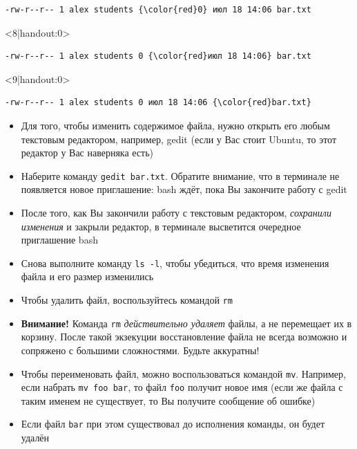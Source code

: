 \documentclass{beamer}
\begin{document}
\begin{frame}[fragile]
\begin{onlyenv}
\begin{Verbatim}[commandchars=\\\{\},codes={\catcode`$=3\catcode`^=7\catcode`_=8}]
-rw-r--r-- 1 alex students {\color{red}0} июл 18 14:06 bar.txt
		\end{Verbatim}
	\end{onlyenv}
	\begin{onlyenv}<8|handout:0>
		\begin{Verbatim}[commandchars=\\\{\},codes={\catcode`$=3\catcode`^=7\catcode`_=8}]
-rw-r--r-- 1 alex students 0 {\color{red}июл 18 14:06} bar.txt
		\end{Verbatim}
	\end{onlyenv}
	\begin{onlyenv}<9|handout:0>
		\begin{Verbatim}[commandchars=\\\{\},codes={\catcode`$=3\catcode`^=7\catcode`_=8}]
-rw-r--r-- 1 alex students 0 июл 18 14:06 {\color{red}bar.txt}
		\end{Verbatim}
	\end{onlyenv}
\end{frame}

\begin{frame}
	\begin{itemize}
		\item{Для того, чтобы изменить содержимое файла, нужно открыть его любым текстовым редактором, например, gedit (если у Вас стоит Ubuntu, то этот редактор у Вас наверняка есть)}\pause
		\item{Наберите команду \texttt{gedit bar.txt}. Обратите внимание, что в терминале не появляется новое приглашение: bash ждёт, пока Вы закончите работу с gedit}\pause
		\item{После того, как Вы закончили работу с текстовым редактором, \emph{сохранили изменения} и закрыли редактор, в терминале высветится очередное приглашение bash}\pause
		\item{Снова выполните команду \texttt{ls~-l}, чтобы убедиться, что время изменения файла и его размер изменились}
	\end{itemize}
\end{frame}

\begin{frame}
	\begin{itemize}
		\item{Чтобы удалить файл, воспользуйтесь командой \texttt{rm}}\pause
		\item{\textbf{Внимание!} Команда \texttt{rm} \emph{действительно удаляет} файлы, а не перемещает их в корзину. После такой экзекуции восстановление файла не всегда возможно и сопряжено с большими сложностями. Будьте аккуратны!}\pause
		\item{Чтобы переименовать файл, можно воспользоваться командой \texttt{mv}. Например, если набрать \texttt{mv~foo~bar}, то файл \texttt{foo} получит новое имя (если же файла с таким именем не существует, то Вы получите сообщение об ошибке)}\pause
		\item{Если файл \texttt{bar} при этом существовал до исполнения команды, он будет удалён}
	\end{itemize}
\end{frame}
\end{document}
